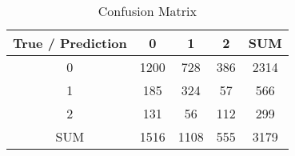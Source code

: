 \documentclass{article}%
\begin{document}
%
\normalsize%
\begin{table}[!ht]
    \centering
    \caption{Confusion Matrix}
    \label{tbl:performance_results}
    \begin{tabular}{|c|c|c|c|c|}
        \hline True / Prediction  & 0 & 1 & 2 & SUM\\
        \hline 0 & 1200 & 728 & 386 & 2314\\
        \hline 1 & 185 & 324 & 57 & 566\\
        \hline 2 & 131 & 56 & 112 & 299\\
        \hline SUM & 1516 & 1108 & 555 & 3179\\
        \hline
    \end{tabular}
\end{table}%
\end{document}
